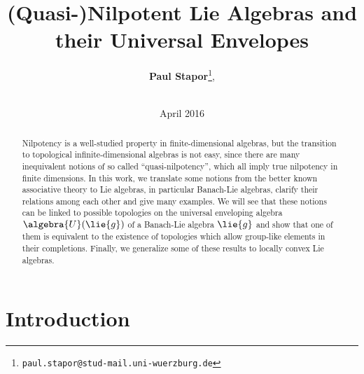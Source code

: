 \documentclass[
11pt,                          %
english                        %
]{article}
\title{(Quasi-)Nilpotent Lie Algebras and their Universal Envelopes}
\author{
  \textbf{Paul Stapor}\thanks{\texttt{paul.stapor@stud-mail.uni-wuerzburg.de}},
  \addtocounter{footnote}{2}
  \\[0.5cm]
  \chairXaddress
}
\date{April 2016}
\begin{document}
%
%

\maketitle

%
%

\begin{abstract}
    Nilpotency is a well-studied property in finite-dimensional algebras, but the 
    transition to topological infinite-dimensional algebras is not easy, since there 
    are many inequivalent notions of so called ``quasi-nilpotency'', which all imply 
    true nilpotency in finite dimensions. In this work, we translate some notions 
    from the better known associative theory to Lie algebras, in particular 
    Banach-Lie algebras, clarify their relations among each other and give many 
    examples. We will see that these notions can be linked to possible topologies on 
    the universal enveloping algebra $\algebra{U}(\lie{g})$ of a Banach-Lie algebra 
    $\lie{g}$ and show that one of them is equivalent to the existence of 
    topologies which allow group-like elements in their completions. Finally, we 
    generalize some of these results to locally convex Lie algebras.
\end{abstract}

\newpage

%
%

\tableofcontents

\newpage

%
%

\section{Introduction}
\label{sec:Introduction}
\end{document}
